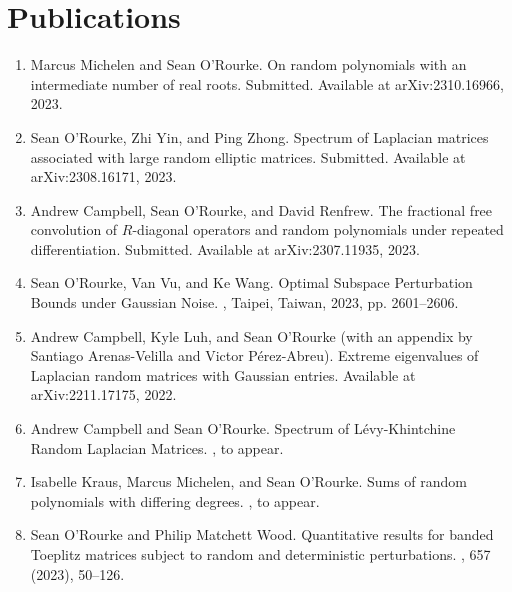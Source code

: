 \documentclass[letterpaper]{article}
\begin{document}
\section*{Publications}
\begin{enumerate}
	\item Marcus Michelen and Sean O'Rourke. 
	\newblock On random polynomials with an intermediate number of real roots. 
	\newblock Submitted.  Available at arXiv:2310.16966, 2023.  
	
	\item Sean O'Rourke, Zhi Yin, and Ping Zhong. 
	\newblock Spectrum of Laplacian matrices associated with large random elliptic matrices.
	\newblock Submitted.  Available at arXiv:2308.16171, 2023. 

	\item Andrew Campbell, Sean O'Rourke, and David Renfrew. 
	\newblock The fractional free convolution of $R$-diagonal operators and random polynomials under repeated differentiation. 
	\newblock Submitted.  Available at arXiv:2307.11935, 2023. 
	
	\item Sean O'Rourke, Van Vu, and Ke Wang. 
	\newblock Optimal Subspace Perturbation Bounds under Gaussian Noise. 
	, Taipei, Taiwan, 2023, pp. 2601--2606. 

	\item Andrew Campbell, Kyle Luh, and Sean O'Rourke (with an appendix by Santiago Arenas-Velilla and Victor P\'{e}rez-Abreu). 
	\newblock Extreme eigenvalues of Laplacian random matrices with Gaussian entries.  
	\newblock Available at arXiv:2211.17175, 2022.  

	\item Andrew Campbell and Sean O'Rourke. 
	\newblock Spectrum of L\'{e}vy-Khintchine Random Laplacian Matrices. 
	, to appear.  

	\item Isabelle Kraus, Marcus Michelen, and Sean O'Rourke.
	\newblock Sums of random polynomials with differing degrees. 
	, to appear.  
	
	\item Sean O'Rourke and Philip Matchett Wood.
	\newblock Quantitative results for banded Toeplitz matrices subject to random and deterministic perturbations. 
	,  657 (2023), 50--126. 
	

\end{enumerate}
\end{document}

